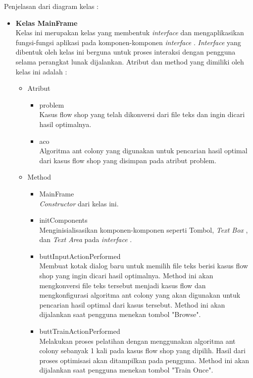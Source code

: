 	Penjelasan dari diagram kelas : 
	\begin{itemize}
		\item \textbf{Kelas MainFrame} \\
		Kelas ini merupakan kelas yang membentuk { \it interface } dan mengaplikasikan fungsi-fungsi aplikasi
		pada komponen-komponen {\it interface }. {\it Interface } yang dibentuk oleh kelas ini berguna
		untuk proses interaksi dengan pengguna selama perangkat lunak dijalankan. Atribut dan
		method yang dimiliki oleh kelas ini adalah :
		
		\begin{itemize}
			\item Atribut 
			\begin{itemize}
				\item problem \\
				Kasus flow shop yang telah dikonversi dari file teks dan ingin dicari hasil
				optimalnya.
				\item aco \\
				Algoritma ant colony yang digunakan untuk pencarian hasil optimal dari kasus flow shop yang disimpan
				pada atribut problem.
			\end{itemize}
			\item Method 
			\begin{itemize}
				\item MainFrame \\
				{\it Constructor } dari kelas ini.
				\item initComponents \\
				Menginisialisasikan komponen-komponen seperti Tombol, {\it Text Box }, dan {\it Text Area}
				pada {\it interface }.
				\item buttInputActionPerformed \\
				Membuat kotak dialog baru untuk memilih file teks berisi kasus flow shop
				yang ingin dicari hasil optimalnya. Method ini akan mengkonversi file teks tersebut
				menjadi kasus flow dan mengkonfigurasi algoritma ant colony yang
				akan digunakan untuk pencarian hasil optimal dari kasus tersebut. Method ini akan
				dijalankan saat pengguna menekan tombol "Browse".
				\item buttTrainActionPerformed \\
				Melakukan proses pelatihan dengan menggunakan algoritma ant colony sebanyak
				1 kali pada kasus flow shop yang dipilih. Hasil dari proses optimisasi akan
				ditampilkan pada pengguna. Method ini akan dijalankan saat pengguna menekan
				tombol "Train Once".

\end{itemize}
\end{itemize}
\end{itemize}
